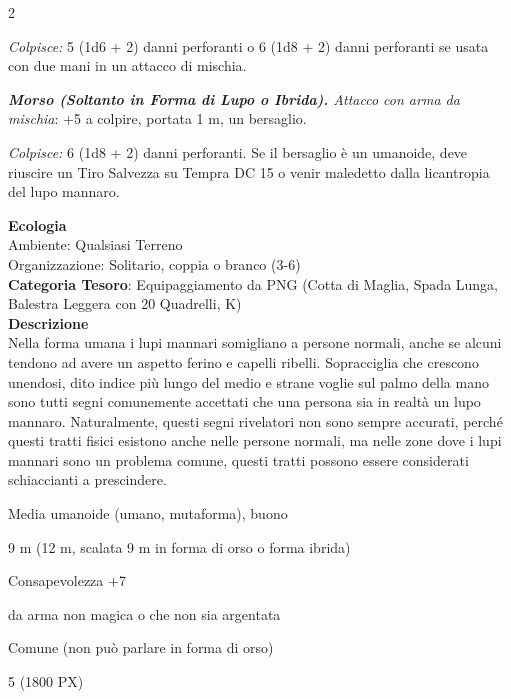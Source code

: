 \begin{multicols}{2}
{\emph{Colpisce:} 5 (1d6 + 2) danni perforanti o 6 (1d8 + 2) danni perforanti se usata con due mani in un attacco di mischia.

\emph{\textbf{Morso (Soltanto in Forma di Lupo o Ibrida).} Attacco con arma da mischia}: +5 a colpire, portata 1 m, un bersaglio.

\emph{Colpisce:} 6 (1d8 + 2) danni perforanti. Se il bersaglio è un umanoide, deve riuscire un Tiro Salvezza su Tempra DC 15 o venir maledetto dalla licantropia del lupo mannaro.

\textbf{Ecologia}\\
Ambiente: Qualsiasi Terreno\\
Organizzazione: Solitario, coppia o branco (3-6)\\
\textbf{Categoria Tesoro}: Equipaggiamento da PNG (Cotta di Maglia, Spada Lunga, Balestra Leggera con 20 Quadrelli, K)\\
\textbf{Descrizione}\\
Nella forma umana i lupi mannari somigliano a persone normali, anche se alcuni tendono ad avere un aspetto ferino e capelli ribelli. Sopracciglia che crescono unendosi, dito indice più lungo del medio e strane voglie sul palmo della mano sono tutti segni comunemente accettati che una persona sia in realtà un lupo mannaro. Naturalmente, questi segni rivelatori non sono sempre accurati, perché questi tratti fisici esistono anche nelle persone normali, ma nelle zone dove i lupi mannari sono un problema comune, questi tratti possono essere considerati schiaccianti a prescindere.

\begin{description}[noitemsep, topsep=0pt, parsep=0pt, partopsep=0pt, itemsep=1pt, leftmargin=2.35cm,  labelwidth=2.2cm, itemindent=0cm, listparindent=0pt] %
\setlength{\baselineskip}{10pt}
\item[\textbf{Taglia/Tipo}] Media umanoide (umano, mutaforma), buono
\item[\textbf{Caratt.}] 
\item[\textbf{Punti Ferita}] 
\item[\textbf{Movimento}] 9 m (12 m, scalata 9 m in forma di orso o forma ibrida)
\item[\textbf{Tiri Salvez.}] 
\item[\textbf{Comp.}] Consapevolezza +7
\item[\textbf{Imm. Danni}] da arma non magica o che non sia argentata
\item[\textbf{Linguaggi}] Comune (non può parlare in forma di orso)
\item[\textbf{Sfida}] 5 (1800 PX)
\end{description}
\smallskip

}
\end{multicols}

